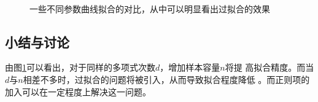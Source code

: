 \documentclass[10pt,a4paper]{article}
\theoremstyle{mythm}%
\numberwithin{equation}{section}
\begin{document}
\begin{CJK*}{UTF8}{wqyzh}
\begin{figure}[h]
{    }
    \\
    \caption{
        一些不同参数曲线拟合的对比，从中可以明显看出过拟合的效果
    }{}
    \label{fig:curve-fit}
\end{figure}

\subsection{小结与讨论}
由图\ref{fig:curve-fit}可以看出，对于同样的多项式次数$d$，增加样本容量$n$将提
高拟合精度。而当$d$与$n$相差不多时，过拟合的问题将被引入，从而导致拟合程度降低
。而正则项的加入可以在一定程度上解决这一问题。


\end{CJK*}
\end{document}
